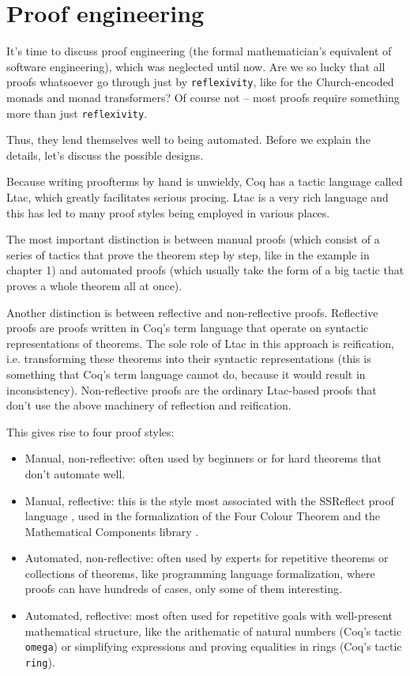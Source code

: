\documentclass[declaration,inz,english,shortabstract]{iithesis}
\newcommand{\m}[1]{\texttt{#1}}
\begin{document}
\section{Proof engineering}

It's time to discuss proof engineering (the formal mathematician's equivalent of software engineering), which was neglected until now. Are we so lucky that all proofs whatsoever go through just by \m{reflexivity}, like for the Church-encoded monads and monad transformers? Of course not -- most proofs require something more than just \m{reflexivity}.

Thus, they lend themselves well to being automated. Before we explain the details, let's discuss the possible designs.

Because writing proofterms by hand is unwieldy, Coq has a tactic language called Ltac, which greatly facilitates serious procing. Ltac is a very rich language and this has led to many proof styles being employed in various places.

The most important distinction is between manual proofs (which consist of a series of tactics that prove the theorem step by step, like in the example in chapter 1) and automated proofs (which usually take the form of a big tactic that proves a whole theorem all at once).

Another distinction is between reflective and non-reflective proofs. Reflective proofs are proofs written in Coq's term language that operate on syntactic representations of theorems. The sole role of Ltac in this approach is reification, i.e. transforming these theorems into their syntactic representations (this is something that Coq's term language cannot do, because it would result in inconsistency). Non-reflective proofs are the ordinary Ltac-based proofs that don't use the above machinery of reflection and reification.

This gives rise to four proof styles:

\begin{itemize}
    \item Manual, non-reflective: often used by beginners or for hard theorems that don't automate well.
    \item Manual, reflective: this is the style most associated with the SSReflect proof language \cite{SSReflect1} \cite{SSReflect2}, used in the formalization of the Four Colour Theorem \cite{FourColour1} \cite{FourColour2} and the Mathematical Components library \cite{MCB}.
    \item Automated, non-reflective: often used by experts for repetitive theorems or collections of theorems, like programming language formalization, where proofs can have hundreds of cases, only some of them interesting.
    \item Automated, reflective: most often used for repetitive goals with well-present mathematical structure, like the arithematic of natural numbers (Coq's tactic \m{omega}) or simplifying expressions and proving equalities in rings (Coq's tactic \m{ring}).
\end{itemize}
\end{document}
